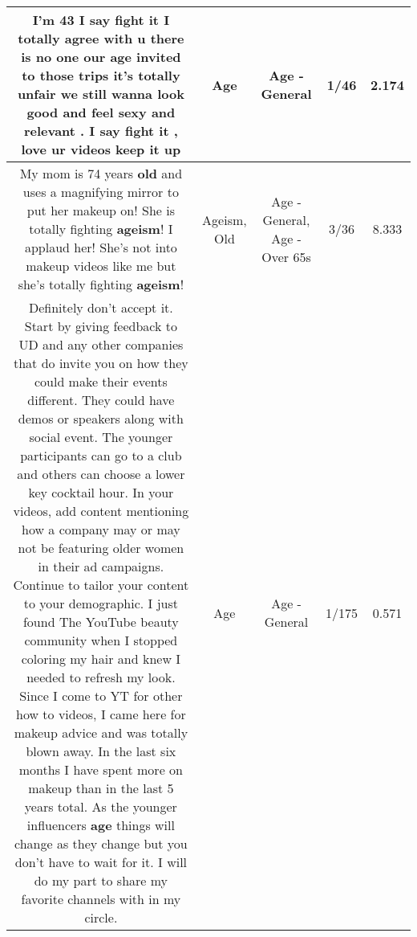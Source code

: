 \documentclass[11pt]{article}
\newlength\mylength
\begin{document}
\begin{center}
\begin{longtable}{|C{.65\mylength}|C{.30\mylength}|C{.12\mylength}|C{.12\mylength}|C{.12\mylength}|}
  \small I'm 43 I say fight it I totally agree with u there is no one our \textbf{age} invited to those trips it's totally unfair we still wanna look good and feel sexy and relevant . I say fight it , love ur videos keep it up\normalsize   & Age & Age - General & 1/46 & 2.174 \\  \hline
  \small My mom is 74 years \textbf{old} and uses a magnifying mirror to put her makeup on! She is totally fighting \textbf{ageism}! I applaud her! She's not into makeup videos like me but she's totally fighting \textbf{ageism}!\normalsize   & Ageism, Old & Age - General, Age - Over 65s & 3/36 & 8.333 \\  \hline
  \small Definitely don't accept it.  Start by giving feedback to UD and any other companies that do invite you on how they could make their events different.  They could have demos or speakers along with social event.  The younger participants can go to a club and others can choose a lower key cocktail hour.  In your videos, add content mentioning how a company may or may not be featuring older women in their ad campaigns.  Continue to tailor your content to your demographic.  I just found The YouTube beauty community when I stopped coloring my hair and knew I needed to refresh my look.  Since I come to YT for other how to videos, I came here for makeup advice and was totally blown away.  In the last six months I have spent more on makeup than in the last 5 years total.  As the younger influencers \textbf{age} things will change as they change but you don't have to wait for it.  I will do my part to share my favorite channels with in my circle.\normalsize   & Age & Age - General & 1/175 & 0.571 \\  \hline

\end{longtable}
\end{center}
\end{document}
